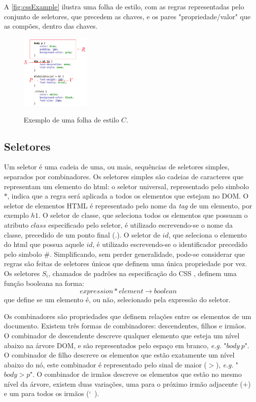A \autoref{fig:cssExample} ilustra uma folha de estilo, com as regras representadas pelo conjunto de seletores, que precedem as chaves, e os pares "propriedade/valor" que as compões, dentro das chaves.

\begin{figure}[!htb]
	\centering
	\caption{Exemplo de uma folha de estilo \(C\).}
	\includegraphics[width=0.3\textwidth]{./04-figuras/css_example_marked}
	\label{fig:cssExample}
\end{figure}

\subsection{Seletores}
\label{subsec:seletores}
Um seletor é uma cadeia de uma, ou mais, sequências de seletores simples, separados por combinadores. Os seletores simples são cadeias de caracteres que representam um elemento do html: o seletor universal, representado pelo simbolo \(\ast\), indica que a regra será aplicada a todos os elementos que estejam no DOM. O seletor de elementos HTML é representado pelo nome da \textit{tag} de um elemento, por exemplo \(h1\). O seletor de classe, que seleciona todos os elementos que possuam o atributo \(class\) especificado pelo seletor, é utilizado escrevendo-se o nome da classe,  precedido de um ponto final (\(.\)). O seletor de \(id\), que seleciona o elemento do html que possua aquele \(id\), é utilizado escrevendo-se o identificador precedido pelo simbolo \(\#\). 
Simplificando, sem perder generalidade, pode-se considerar que regras são feitas de seletores únicos que definem uma única propriedade por vez. Os seletores \(S_i\), chamados de padrões na especificação do CSS \cite{CSSspec2009}, definem uma função booleana na forma:
\begin{equation}
	expression * element \rightarrow boolean
\end{equation}
que define se um elemento é, ou não, selecionado pela expressão do seletor.

Os combinadores são propriedades que definem relações entre os elementos de um documento. Existem três formas de combinadores: descendentes, filhos e irmãos. O combinador de descendente descreve qualquer elemento que esteja um nível abaixo na árvore DOM, e são representados pelo espaço em branco, \textit{e.g.} "$body\ p$". O combinador de filho descreve os elementos que estão exatamente um nível abaixo do nó, este combinador é representado pelo sinal de maior ($>$), \textit{e.g.} "$body > p$". O combinador de irmãos descreve os elementos que estão no mesmo nível da árvore, existem duas variações, uma para o próximo irmão adjacente ($+$) e um para todos os irmãos (\char`~).

